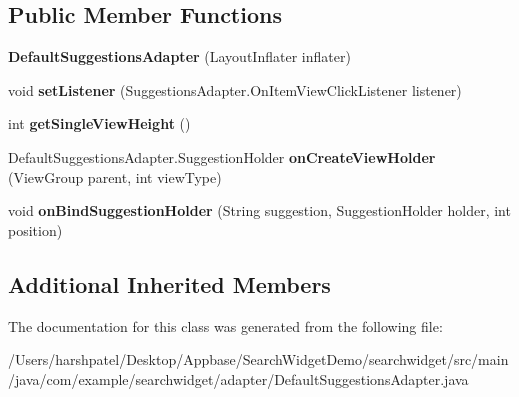 \subsection*{Public Member Functions}
\begin{DoxyCompactItemize}
\item 
\mbox{\label{classcom_1_1example_1_1searchwidget_1_1adapter_1_1_default_suggestions_adapter_a461be37f2d68a841f7c97eed7831596a}} 
{\bfseries Default\+Suggestions\+Adapter} (Layout\+Inflater inflater)
\item 
\mbox{\label{classcom_1_1example_1_1searchwidget_1_1adapter_1_1_default_suggestions_adapter_ab8e3e91b57b5a9854df9335a575fc064}} 
void {\bfseries set\+Listener} (Suggestions\+Adapter.\+On\+Item\+View\+Click\+Listener listener)
\item 
\mbox{\label{classcom_1_1example_1_1searchwidget_1_1adapter_1_1_default_suggestions_adapter_ae6a5c5a45fc619e5f57678ff8cfa6ed8}} 
int {\bfseries get\+Single\+View\+Height} ()
\item 
\mbox{\label{classcom_1_1example_1_1searchwidget_1_1adapter_1_1_default_suggestions_adapter_a9c220e8cda8dcb13b19353cc5999f253}} 
Default\+Suggestions\+Adapter.\+Suggestion\+Holder {\bfseries on\+Create\+View\+Holder} (View\+Group parent, int view\+Type)
\item 
\mbox{\label{classcom_1_1example_1_1searchwidget_1_1adapter_1_1_default_suggestions_adapter_a58949f766bce74a4cb9c9c2567f82ec9}} 
void {\bfseries on\+Bind\+Suggestion\+Holder} (String suggestion, Suggestion\+Holder holder, int position)
\end{DoxyCompactItemize}
\subsection*{Additional Inherited Members}


The documentation for this class was generated from the following file\+:\begin{DoxyCompactItemize}
\item 
/\+Users/harshpatel/\+Desktop/\+Appbase/\+Search\+Widget\+Demo/searchwidget/src/main/java/com/example/searchwidget/adapter/Default\+Suggestions\+Adapter.\+java\end{DoxyCompactItemize}
